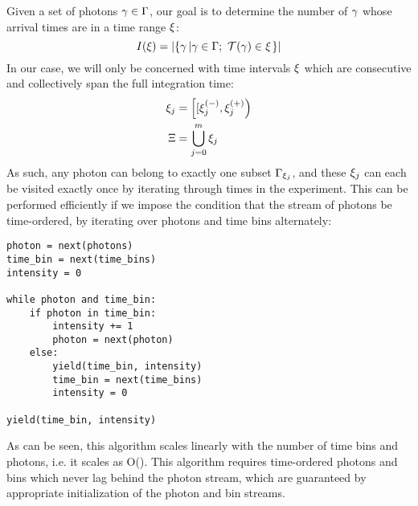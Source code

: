 Given a set of photons $\gamma\in\Gamma$, our goal is to determine the number of $\gamma$ whose arrival times are in a time range $\xi$:
\begin{equation}
I(\xi) = \left|\left\lbrace \gamma \left| \gamma\in\Gamma;~\mathcal{T}(\gamma)\in\xi \right. \right\rbrace\right|
\end{equation}
In our case, we will only be concerned with time intervals $\xi$ which are consecutive and collectively span the full integration time:
\begin{align}
\xi_{j} &= \left[[\xi_{j}^{(-)},\xi_{j}^{(+)}\right) \\
\Xi &= \bigcup\limits_{j=0}^{m}{\xi_{j}}
\end{align}
As such, any photon can belong to exactly one subset $\Gamma_{\xi_{j}}$, and these $\xi_{j}$ can each be visited exactly once by iterating through times in the experiment. This can be performed efficiently if we impose the condition that the stream of photons be time-ordered, by iterating over photons and time bins alternately:
\lstset{language=Python}
\begin{lstlisting}
photon = next(photons)
time_bin = next(time_bins)
intensity = 0

while photon and time_bin:
    if photon in time_bin:
        intensity += 1
        photon = next(photon)
    else:
        yield(time_bin, intensity)
        time_bin = next(time_bins)
        intensity = 0

yield(time_bin, intensity)
\end{lstlisting}
As can be seen, this algorithm scales linearly with the number of time bins and photons, i.e. it scales as O(\abs{\photons}). This algorithm requires time-ordered photons and bins which never lag behind the photon stream, which are guaranteed by appropriate initialization of the photon and bin streams.

